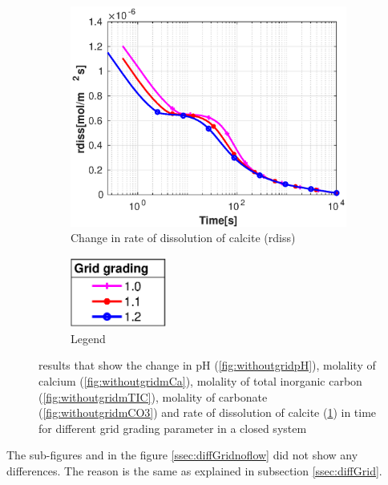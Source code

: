 \begin{figure}[!h]
\begin{subfigure}{.5\linewidth}
    \end{subfigure}%
    \hfill
    \begin{subfigure}{.5\linewidth}
            \centering
        \includegraphics[width=\textwidth]{PICTURES/without_grid_rdiss.eps}
        \caption{Change in rate of dissolution of calcite (rdiss)}
        \label{fig:withoutgridrdiss}
    \end{subfigure}%
  \hfill
  \begin{subfigure}{.5\linewidth}
            \centering
        \includegraphics[width=0.35\textwidth]{PICTURES/with_grid_legend.eps}
        \caption{Legend}
        \label{fig:withoutgridlegend}
    \end{subfigure}%
    \caption{\DuMuX results that show the change in pH (\cref{fig:withoutgridpH}), molality of calcium (\cref{fig:withoutgridmCa}), molality of total inorganic carbon (\cref{fig:withoutgridmTIC}), molality of carbonate (\cref{fig:withoutgridmCO3}) and rate of dissolution of calcite (\cref{fig:withoutgridrdiss}) in time for different grid grading parameter in a closed system} 
    \label{fig:comparisionWithoutDiffgrid}
\end{figure}

The sub-figures  and  in the figure \ref{ssec:diffGridnoflow} did not show any differences. The reason is the same as explained in subsection \ref{ssec:diffGrid}.

